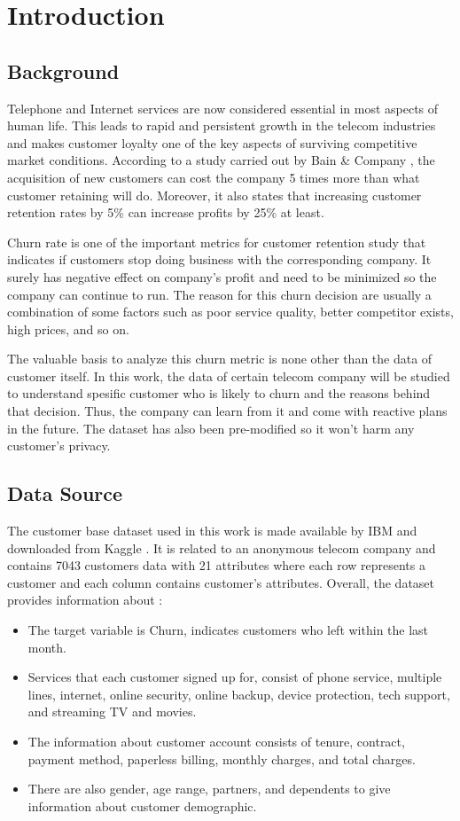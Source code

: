\section{Introduction}
\subsection{Background}
	Telephone and Internet services are now considered essential in most aspects of human life. This leads to rapid and persistent growth in the telecom industries and makes customer loyalty one of the key aspects of surviving competitive market conditions. According to a study carried out by Bain \& Company \cite{bain}, the acquisition of new customers can cost the company 5 times more than what customer retaining will do. Moreover, it also states that increasing customer retention rates by 5\% can increase profits by 25\% at least.  
	
	
	Churn rate is one of the important metrics for customer retention study that indicates if customers stop doing business with the corresponding company. It surely has negative effect on company's profit and need to be minimized so the company can continue to run. The reason for this churn decision are usually a combination of some factors such as poor service quality, better competitor exists, high prices, and so on.
	
	The valuable basis to analyze this churn metric is none other than the data of customer itself. In this work, the data of certain telecom company will be studied to understand spesific customer who is likely to churn and the reasons behind that decision. Thus, the company can learn from it and come with reactive plans in the future. The dataset has also been pre-modified so it won't harm any customer's privacy.

\subsection{Data Source}
The customer base dataset used in this work is made available by IBM and downloaded from Kaggle \cite{kaggle}. It is related to an anonymous telecom company and contains 7043 customers data with 21 attributes where each row represents a customer and each column contains customer’s attributes. Overall, the dataset provides information about :
\begin{itemize}
	\item The target variable is Churn, indicates customers who left within the last month.
	\item Services that each customer signed up for, consist of phone service, multiple lines, internet, online security, online backup, device protection, tech support, and streaming TV and movies.
	\item The information about customer account consists of tenure, contract, payment method, paperless billing, monthly charges, and total charges.
	\item There are also gender, age range, partners, and dependents to give information about customer demographic.
\end{itemize}

